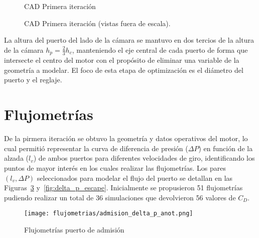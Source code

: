 \begin{figure}[h!]
  \centering
  \hfill
  \caption{CAD Primera iteración}\label{fig:motor_cad1}
\end{figure}


\begin{figure}[h!]
  \centering
  \caption{CAD Primera iteración (vistas fuera de escala).}\label{fig:motor_cad2}
\end{figure}

La altura del puerto del lado de la cámara se mantuvo en dos tercios de la
altura de la cámara $h_{p} = \frac{2}{3}h_{c}$, manteniendo el eje central de cada
puerto de forma que intersecte el centro del motor con el propósito de eliminar
una variable de la geometría a modelar.
%
El foco de esta etapa de optimización es el diámetro del puerto y el reglaje.
%


\section{Flujometrías}

De la pirmera iteración se obtuvo la geometría y datos operativos del motor, lo
cual permitió representar la curva de diferencia de presión ($\Delta P$) en
función de la alzada ($l_{v}$) de ambos puertos para diferentes velocidades de
giro, identificando los puntos de mayor interés en los cuales realizar las
flujometrías.
%
Los pares $(l_{v}, \Delta P)$ seleccionados para modelar el flujo del puerto se
detallan en las Figuras~\ref{fig:delta_p_admision} y~\ref{fig:delta_p_escape}.
%
Inicialmente se propusieron 51 flujometrías pudiendo realizar un total de 36
simulaciones que devolvieron 56 valores de $C_{D}$.

\begin{figure}[h!]
  \centering
  \texttt{[image: flujometrias/admision\_delta\_p\_anot.png]}
  \caption{Flujometrías puerto de admisión}\label{fig:delta_p_admision}
\end{figure}

